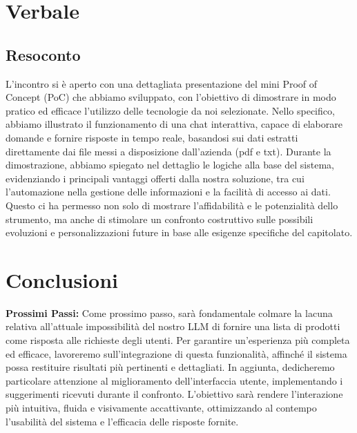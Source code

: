 \documentclass{article}
\begin{document}
\section{Verbale}
    \subsection{Resoconto}
    L'incontro si è aperto con una dettagliata presentazione del mini Proof of Concept (PoC) che abbiamo sviluppato, con l'obiettivo di dimostrare in modo pratico ed efficace l'utilizzo delle tecnologie da noi selezionate. Nello specifico, abbiamo illustrato il funzionamento di una chat interattiva, capace di elaborare domande e fornire risposte in tempo reale, basandosi sui dati estratti direttamente dai file messi a disposizione dall'azienda (pdf e txt).
    Durante la dimostrazione, abbiamo spiegato nel dettaglio le logiche alla base del sistema, evidenziando i principali vantaggi offerti dalla nostra soluzione, tra cui l'automazione nella gestione delle informazioni e la facilità di accesso ai dati. Questo ci ha permesso non solo di mostrare l'affidabilità e le potenzialità dello strumento, ma anche di stimolare un confronto costruttivo sulle possibili evoluzioni e personalizzazioni future in base alle esigenze specifiche del capitolato.


    \section{Conclusioni}  %
    \textbf{Prossimi Passi:} 
    Come prossimo passo, sarà fondamentale colmare la lacuna relativa all'attuale impossibilità del nostro LLM di fornire una lista di prodotti come risposta alle richieste degli utenti. Per garantire un'esperienza più completa ed efficace, lavoreremo sull'integrazione di questa funzionalità, affinché il sistema possa restituire risultati più pertinenti e dettagliati.
    In aggiunta, dedicheremo particolare attenzione al miglioramento dell'interfaccia utente, implementando i suggerimenti ricevuti durante il confronto. L'obiettivo sarà rendere l'interazione più intuitiva, fluida e visivamente accattivante, ottimizzando al contempo l'usabilità del sistema e l'efficacia delle risposte fornite.
\end{document}
